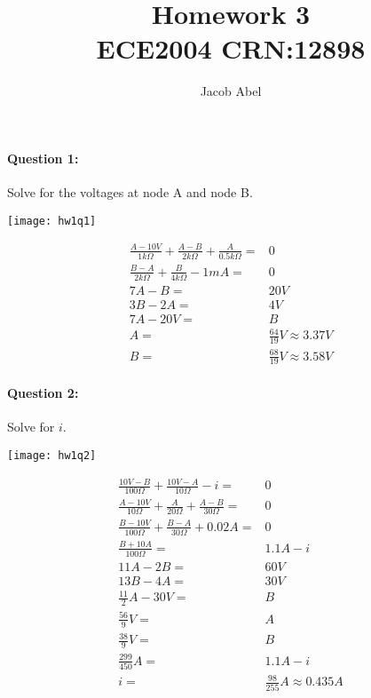 \documentclass[12pt,letterpaper,titlepage]{article}
\author{Jacob Abel}
\title{	Homework 3
	\\\large ECE2004 CRN:12898
}
\begin{document}
\maketitle
\begin{raggedright}

\paragraph{Question 1: }

Solve for the voltages at node A and node B.

\begin{center}
\texttt{[image: hw1q1]}
\end{center}

\begin{align*}
    \frac{A-10V}{1k\Omega} + \frac{A-B}{2k\Omega} + \frac{A}{0.5k\Omega} =& 0
\\  \frac{B-A}{2k\Omega} + \frac{B}{4k\Omega} - 1mA =& 0
\\  7A - B =& 20V
\\  3B - 2A =& 4V
\\  7A - 20V =& B
\\  A =& \frac{64}{19}V\approx 3.37V
\\  B =& \frac{68}{19}V\approx 3.58V
\end{align*}

\clearpage

\paragraph{Question 2: }

Solve for $i$.

\begin{center}
\texttt{[image: hw1q2]}
\end{center}

\begin{align*}
    \frac{10V-B}{100\Omega} + \frac{10V-A}{10\Omega} - i =& 0
\\  \frac{A-10V}{10\Omega} + \frac{A}{20\Omega} + \frac{A-B}{30\Omega}=& 0
\\  \frac{B-10V}{100\Omega} + \frac{B-A}{30\Omega} + 0.02A =& 0
\\  \frac{B + 10A}{100\Omega} =& 1.1A - i
\\  11A - 2B =& 60V
\\  13B - 4A =& 30V
\\  \frac{11}{2}A - 30V =& B
\\  \frac{56}{9}V =& A
\\  \frac{38}{9}V =& B
\\  \frac{299}{450}A =& 1.1A - i
\\  i =& \frac{98}{255}A \approx 0.435A 
\end{align*}


\end{raggedright}
\end{document}

